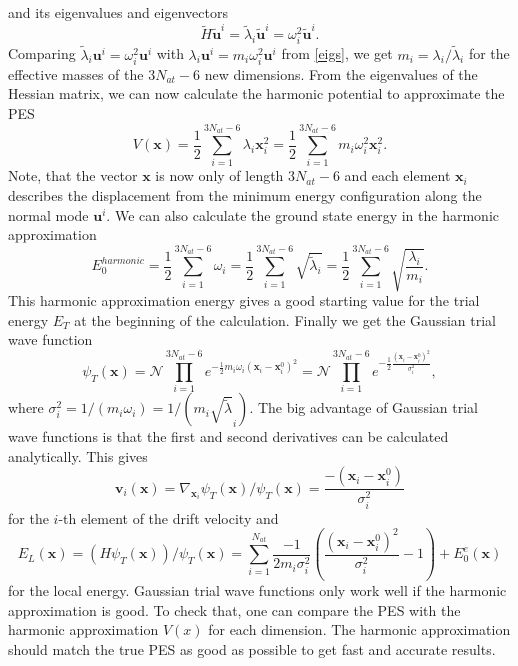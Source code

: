 \documentclass [12pt]{report}
\begin{document}
and its eigenvalues and eigenvectors
\begin{equation}
\tilde{H} \bm{\tilde{u}}^i = \tilde{\lambda}_i \bm{\tilde{u}}^i = \omega_i^2 \bm{\tilde{u}}^i.
\end{equation}
Comparing $\tilde{\lambda}_i \bm{u}^i = \omega_i^2 \bm{u}^i$ with $\lambda_i \bm{u}^i = m_i \omega_i^2 \bm{u}^i$ from \eqref{eigs}, we get $m_i = \lambda_i / \tilde{\lambda}_i$ for the effective masses of the $3 N_{at} - 6$ new dimensions.
From the eigenvalues of the Hessian matrix, we can now calculate the harmonic potential to approximate the PES
\begin{equation}
V(\bm{x}) = \frac{1}{2} \sum_{i=1}^{3N_{at}-6} \lambda_i \bm{x}_i^2 = \frac{1}{2} \sum_{i=1}^{3N_{at}-6} m_i \omega_i^2 \bm{x}_i^2.
\end{equation}
Note, that the vector $\bm{x}$ is now only of length $3 N_{at} - 6$ and  each element $\bm{x}_i$ describes the displacement from the minimum energy configuration along the normal mode $\bm{u}^i$.
We can also calculate the ground state energy in the harmonic approximation
\begin{equation}
E_0^{harmonic} = \frac{1}{2} \sum_{i=1}^{3N_{at}-6} \omega_i = \frac{1}{2}\sum_{i=1}^{3N_{at}-6}  \sqrt{\tilde{\lambda}_i} = \frac{1}{2} \sum_{i=1}^{3N_{at}-6}  \sqrt{\frac{\lambda_i}{m_i}}.
\end{equation}
This harmonic approximation energy gives a good starting value for the trial energy $E_T$ at the beginning of the calculation. Finally we get the Gaussian trial wave function
\begin{equation}
\psi_T(\bm{x}) = \mathcal{N} \prod_{i=1}^{3N_{at}-6}  e^{-\frac{1}{2} m_i \omega_i (\bm{x}_i - \bm{x}^0_i)^2} = \mathcal{N} \prod_{i=1}^{3N_{at}-6} e^{-\frac{1}{2} \frac{(\bm{x}_i - \bm{x}^0_i)^2}{\sigma_i^2}},
\end{equation}
where $\sigma_i^2 = 1/(m_i \omega_i) = 1/(m_i\sqrt{\tilde{\lambda}}_i)$. The big advantage of Gaussian trial wave functions is that the first and second derivatives can be calculated analytically. This gives
\begin{equation}
\bm{v}_i(\bm{x}) = \nabla_{\bm{x}_i} \psi_T(\bm{x})/ \psi_T(\bm{x}) = \frac{-(\bm{x}_i - \bm{x}^0_i)}{\sigma_i^2}
\end{equation}
for the $i$-th element of the drift velocity and 
\begin{equation}\label{el}
E_L(\bm{x}) = (H\psi_T(\bm{x}))/\psi_T(\bm{x}) = \sum_{i=1}^{N_{at}} \frac{-1}{2m_i \sigma^2_i} \left( \frac{(\bm{x}_i - \bm{x}^0_i)^2}{\sigma^2_i} - 1 \right) + E_0^e(\bm{x})
\end{equation}
for the local energy.
Gaussian trial wave functions only work well if the harmonic approximation is good. To check that, one can compare the PES with the harmonic approximation $V(x)$ for each dimension. The harmonic approximation should match the true PES as good as possible to get fast and accurate results.
\end{document}
